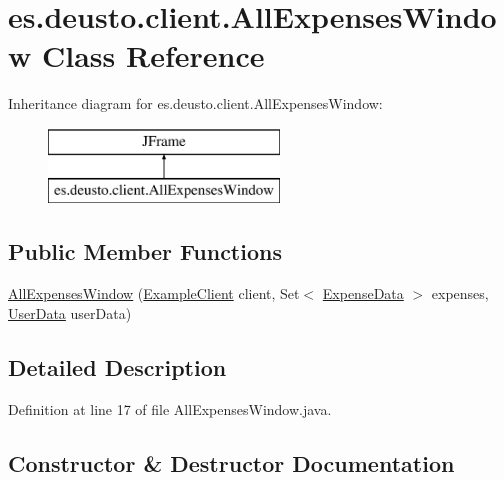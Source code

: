\hypertarget{classes_1_1deusto_1_1client_1_1_all_expenses_window}{}\section{es.\+deusto.\+client.\+All\+Expenses\+Window Class Reference}
\label{classes_1_1deusto_1_1client_1_1_all_expenses_window}
Inheritance diagram for es.\+deusto.\+client.\+All\+Expenses\+Window\+:\begin{figure}[H]
\begin{center}
\leavevmode
\includegraphics[height=2.000000cm]{classes_1_1deusto_1_1client_1_1_all_expenses_window}
\end{center}
\end{figure}
\subsection*{Public Member Functions}
\begin{DoxyCompactItemize}
\item 
\hyperlink{classes_1_1deusto_1_1client_1_1_all_expenses_window_a62b81dbdca10e545b226a51f1660c673}{All\+Expenses\+Window} (\hyperlink{classes_1_1deusto_1_1client_1_1_example_client}{Example\+Client} client, Set$<$ \hyperlink{classes_1_1deusto_1_1serialization_1_1_expense_data}{Expense\+Data} $>$ expenses, \hyperlink{classes_1_1deusto_1_1serialization_1_1_user_data}{User\+Data} user\+Data)
\end{DoxyCompactItemize}


\subsection{Detailed Description}


Definition at line 17 of file All\+Expenses\+Window.\+java.



\subsection{Constructor \& Destructor Documentation}
\mbox{\label{classes_1_1deusto_1_1client_1_1_all_expenses_window_a62b81dbdca10e545b226a51f1660c673}} 

